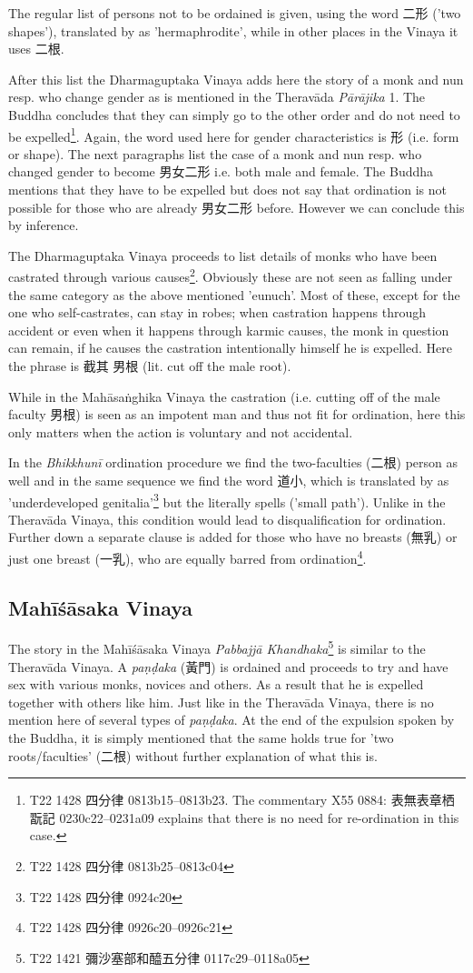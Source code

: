 The regular list of persons not to be ordained is given, using the word 二形 ('two shapes'), translated by \cite{bodhi} as 'hermaphrodite', while in other places in the Vinaya it uses 二根. 

After this list the Dharmaguptaka Vinaya adds here the story of a monk and nun resp. who change gender as is mentioned in the Theravāda {\em Pārājika} 1. The Buddha concludes that they can simply go to the other order and do not need to be expelled\footnote{T22 1428 四分律 0813b15–0813b23. The commentary X55 0884: 表無表章栖翫記 0230c22–0231a09 explains that there is no need for re-ordination in this case.}. Again, the word used here for gender characteristics is 形 (i.e. form or shape). The next paragraphs list the case of a monk and nun resp. who changed gender to become 男女二形 i.e. both male and female. The Buddha mentions that they have to be expelled but does not say that ordination is not possible for those who are already 男女二形 before. However we can conclude this by inference.

The Dharmaguptaka Vinaya proceeds to list details of monks who have been castrated through various causes\footnote{T22 1428 四分律 0813b25–0813c04}. Obviously these are not seen as falling under the same category as the above mentioned 'eunuch'. Most of these, except for the one who self-castrates, can stay in robes; when castration happens through accident or even when it happens through karmic causes, the monk in question can remain, if he causes the castration intentionally himself he is expelled. Here the phrase is 截其 男根 (lit. cut off the male root).

While in the Mahāsaṅghika Vinaya the castration (i.e. cutting off of the male faculty 男根) is seen as an impotent man and thus not fit for ordination, here this only matters when the action is voluntary and not accidental.

In the {\em Bhikkhunī} ordination procedure we find the two-faculties (二根) person as well and in the same sequence we find the word 道小, which is translated by \cite{bodhi} as 'underdeveloped genitalia'\footnote{T22 1428 四分律 0924c20} but the literally spells ('small path'). Unlike in the Theravāda Vinaya, this condition would lead to disqualification for ordination. Further down a separate clause is added for those who have no breasts (無乳) or just one breast (一乳), who are equally barred from ordination\footnote{T22 1428 四分律 0926c20–0926c21}.


\subsection{Mahīśāsaka Vinaya}
The story in the Mahīśāsaka Vinaya {\em Pabbajjā Khandhaka}\footnote{T22 1421 彌沙塞部和醯五分律 0117c29–0118a05} is similar to the Theravāda Vinaya. A {\em paṇḍaka} (黃門) is ordained and proceeds to try and have sex with various monks, novices and others. As a result that he is expelled together with others like him. Just like in the Theravāda Vinaya, there is no mention here of several types of {\em paṇḍaka}. At the end of the expulsion spoken by the Buddha, it is simply mentioned that the same holds true for 'two roots/faculties' (二根) without further explanation of what this is.

